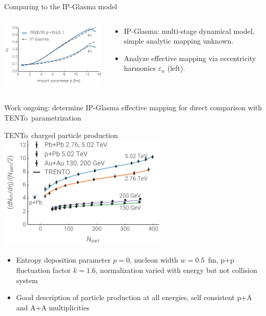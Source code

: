 \documentclass[xcolor=dvipsnames]{beamer}
\newcommand{\trento}{T\raisebox{-0.3ex}{R}ENTo}
\begin{document}
\begin{frame}{Comparing to the IP-Glasma model}
    \centering
    \begin{columns}
        \begin{column}{0.6\textwidth}
            \includegraphics[width=\textwidth]{ipglasma}
        \end{column}
        \begin{column}{0.4\textwidth}
            \begin{itemize}
                \item IP-Glasma: multi-stage dynamical model, simple analytic mapping unknown.
                \item Analyze effective mapping via eccentricity harmonics $\varepsilon_n$ (left).
            \end{itemize}
        \end{column}
    \end{columns}
    \vspace{0.6cm}
    Work ongoing: determine IP-Glasma effective mapping for direct comparison with \trento\ parametrization
\end{frame}

\begin{frame}{\trento\ charged particle production}
    \centering \bigskip
    \includegraphics[width=0.6\textwidth]{nch_per_npart}
    \begin{itemize}
        \item Entropy deposition parameter $p=0$, nucleon width $w=0.5$~fm, p+p fluctuation factor $k=1.6$, normalization varied with energy but not collision system
        \item Good description of particle production at all energies, self consistent p+A and A+A multiplicities
    \end{itemize}
\end{frame}
\end{document}
